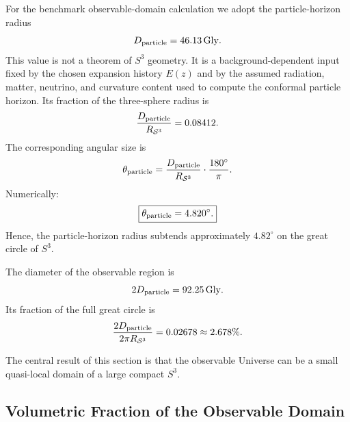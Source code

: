 \documentclass[aps,prd,onecolumn,superscriptaddress,longbibliography,nofootinbib,notitlepage]{revtex4-2}
\newcommand{\Gly}{\,\mathrm{Gly}}
\begin{document}
For the benchmark observable-domain calculation we adopt the particle-horizon radius
\begin{equation}
  D_{\rm particle} = 46.13\Gly.
\end{equation}
This value is not a theorem of $S^3$ geometry. It is a background-dependent input fixed
by the chosen expansion history $E(z)$ and by the assumed radiation, matter, neutrino,
and curvature content used to compute the conformal particle horizon.
Its fraction of the three-sphere radius is
\begin{equation}
  \frac{D_{\rm particle}}{R_{\mathcal{S}^3}} = 0.08412.
\end{equation}
The corresponding angular size is
\begin{equation}
  \theta_{\rm particle}
  = \frac{D_{\rm particle}}{R_{\mathcal{S}^3}} \cdot \frac{180^\circ}{\pi}.
\end{equation}
Numerically:
\begin{equation}
  \boxed{\theta_{\rm particle} = 4.820^\circ.}
\end{equation}
Hence, the particle-horizon radius subtends approximately $4.82^\circ$ on the
great circle of $S^3$.

The diameter of the observable region is
\begin{equation}
  2D_{\rm particle} = 92.25\Gly.
\end{equation}
Its fraction of the full great circle is
\begin{equation}
  \frac{2D_{\rm particle}}{2\pi R_{\mathcal{S}^3}} = 0.02678
  \approx 2.678\%.
\end{equation}

The central result of this section is that the observable Universe can be a
small quasi-local domain of a large compact $S^3$.

\subsection{Volumetric Fraction of the Observable Domain}
\end{document}
